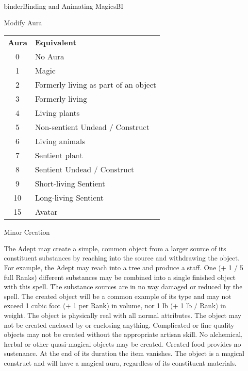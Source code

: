 \begin{college}[1.1]{binder}{Binding and Animating Magics}{BI}
\begin{spell}[G-6]{Modify Aura}
\begin{effects}
\begin{tabular}{cl}
\textbf{Aura} & \textbf{Equivalent} \\
0    & No Aura \\
1    & Magic \\
2    & Formerly living as part of an object \\
3    & Formerly living \\
4    & Living plants \\
5    & Non-sentient Undead / Construct \\
6    & Living animals \\
7    & Sentient plant \\
8    & Sentient Undead / Construct \\
9    & Short-living Sentient \\
10   & Long-living Sentient \\
15   & Avatar \\
\end{tabular}
\end{effects}
\end{spell}

\begin{spell}[G-7]{Minor Creation}

\begin{effects}
The Adept may create a simple, common object from a larger source of
its constituent substances by reaching into the source and withdrawing
the object. For example, the Adept may reach into a tree and produce a
staff. One (+ 1 / 5 full Ranks) different substances may be combined
into a single finished object with this spell. The substance sources
are in no way damaged or reduced by the spell. The created object will
be a common example of its type and may not exceed 1 cubic foot (+ 1
per Rank) in volume, nor 1 lb (+ 1 lb / Rank) in weight. The object is
physically real with all normal attributes. The object may not be
created enclosed by or enclosing anything. Complicated or fine quality
objects may not be created without the appropriate artisan skill. No
alchemical, herbal or other quasi-magical objects may be
created. Created food provides no sustenance.  At the end of its
duration the item vanishes.  The object is a magical construct and
will have a magical aura, regardless of its constituent materials.
\end{effects}
\end{spell}


\end{college}
